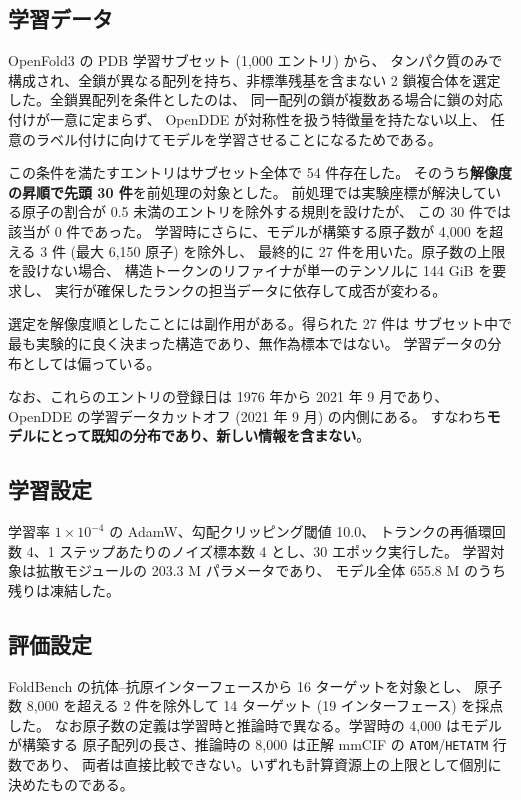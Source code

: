 \documentclass[11pt,a4paper]{article}
\begin{document}
\subsection{学習データ}

OpenFold3 の PDB 学習サブセット (1,000 エントリ) から、
タンパク質のみで構成され、全鎖が異なる配列を持ち、非標準残基を含まない
2 鎖複合体を選定した。全鎖異配列を条件としたのは、
同一配列の鎖が複数ある場合に鎖の対応付けが一意に定まらず、
OpenDDE が対称性を扱う特徴量を持たない以上、
任意のラベル付けに向けてモデルを学習させることになるためである。

この条件を満たすエントリはサブセット全体で 54 件存在した。
そのうち\textbf{解像度の昇順で先頭 30 件}を前処理の対象とした。
前処理では実験座標が解決している原子の割合が 0.5 未満のエントリを除外する規則を設けたが、
この 30 件では該当が 0 件であった。
学習時にさらに、モデルが構築する原子数が 4,000 を超える 3 件 (最大 6,150 原子) を除外し、
最終的に 27 件を用いた。原子数の上限を設けない場合、
構造トークンのリファイナが単一のテンソルに 144 GiB を要求し、
実行が確保したランクの担当データに依存して成否が変わる。

選定を解像度順としたことには副作用がある。得られた 27 件は
サブセット中で最も実験的に良く決まった構造であり、無作為標本ではない。
学習データの分布としては偏っている。

なお、これらのエントリの登録日は 1976 年から 2021 年 9 月であり、
OpenDDE の学習データカットオフ (2021 年 9 月) の内側にある。
すなわち\textbf{モデルにとって既知の分布であり、新しい情報を含まない}。

\subsection{学習設定}

学習率 $1\times10^{-4}$ の AdamW、勾配クリッピング閾値 10.0、
トランクの再循環回数 4、1 ステップあたりのノイズ標本数 4 とし、30 エポック実行した。
学習対象は拡散モジュールの 203.3 M パラメータであり、
モデル全体 655.8 M のうち残りは凍結した。

\subsection{評価設定}

FoldBench の抗体--抗原インターフェースから 16 ターゲットを対象とし、
原子数 8,000 を超える 2 件を除外して 14 ターゲット (19 インターフェース) を採点した。
なお原子数の定義は学習時と推論時で異なる。学習時の 4,000 はモデルが構築する
原子配列の長さ、推論時の 8,000 は正解 mmCIF の \texttt{ATOM}/\texttt{HETATM} 行数であり、
両者は直接比較できない。いずれも計算資源上の上限として個別に決めたものである。
\end{document}
